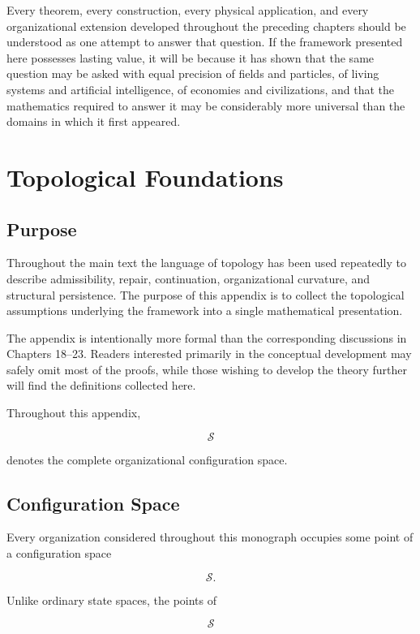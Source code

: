 \documentclass[11pt,oneside]{book}
\numberwithin{equation}{chapter}
\theoremstyle{definition}
\theoremstyle{plain}
\begin{document}
Every theorem, every construction, every physical application, and every
organizational extension developed throughout the preceding chapters
should be understood as one attempt to answer that question. If the
framework presented here possesses lasting value, it will be because it
has shown that the same question may be asked with equal precision of
fields and particles, of living systems and artificial intelligence, of
economies and civilizations, and that the mathematics required to answer
it may be considerably more universal than the domains in which it first
appeared.


\appendix

\chapter{Topological Foundations}

\section{Purpose}

Throughout the main text the language of topology has been used repeatedly
to describe admissibility, repair, continuation, organizational curvature,
and structural persistence. The purpose of this appendix is to collect the
topological assumptions underlying the framework into a single mathematical
presentation.

The appendix is intentionally more formal than the corresponding
discussions in Chapters 18--23. Readers interested primarily in the
conceptual development may safely omit most of the proofs, while those
wishing to develop the theory further will find the definitions collected
here.

Throughout this appendix,

\[
\mathcal S
\]

denotes the complete organizational configuration space.

\section{Configuration Space}

Every organization considered throughout this monograph occupies some point
of a configuration space

\[
\mathcal S.
\]

Unlike ordinary state spaces, the points of

\[
\mathcal S
\]
\end{document}
